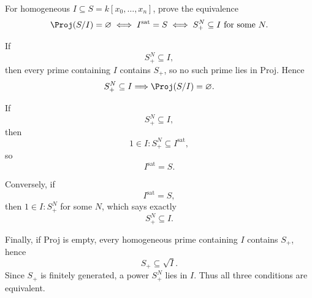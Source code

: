 \begin{problem}\label{prob:vi37-18}
For homogeneous \(I\subseteq S=k[x_0,\ldots,x_n]\), prove the equivalence
\[
\Proj(S/I)=\varnothing
\iff
I^{\mathrm{sat}}=S
\iff
S_+^N\subseteq I\text{ for some }N.
\]

\end{problem}

\ifdefined\FullProblemDossiers
\begin{solution}
If
\[
S_+^N\subseteq I,
\]
then every prime containing \(I\) contains \(S_+\), so no such prime lies in Proj. Hence
\[
S_+^N\subseteq I\Longrightarrow\Proj(S/I)=\varnothing.
\]

If
\[
S_+^N\subseteq I,
\]
then
\[
1\in I:S_+^N\subseteq I^{\mathrm{sat}},
\]
so
\[
I^{\mathrm{sat}}=S.
\]

Conversely, if
\[
I^{\mathrm{sat}}=S,
\]
then \(1\in I:S_+^N\) for some \(N\), which says exactly
\[
S_+^N\subseteq I.
\]

Finally, if Proj is empty, every homogeneous prime containing \(I\) contains \(S_+\), hence
\[
S_+\subseteq\sqrt I.
\]
Since \(S_+\) is finitely generated, a power \(S_+^N\) lies in \(I\). Thus all three conditions are equivalent.
\end{solution}
\fi
